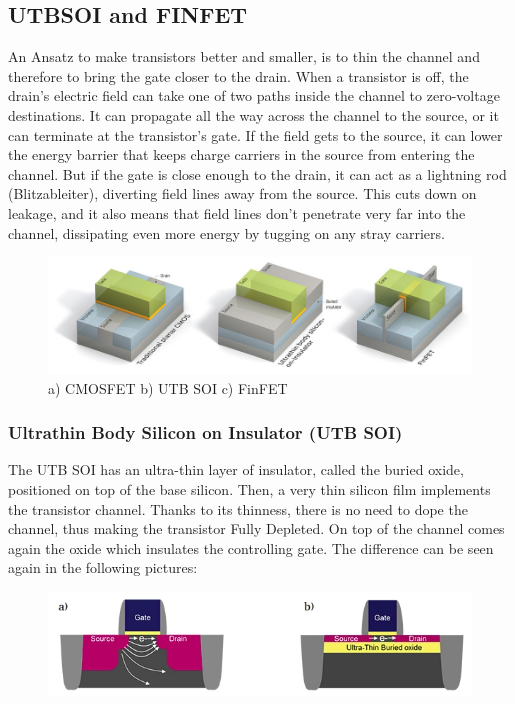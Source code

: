 \documentclass[11pt]{article}
\begin{document}
\subsection{UTBSOI and FINFET}
An Ansatz to make transistors better and smaller, is to thin the channel and therefore to bring the gate closer to the drain. When a transistor is off, the drain’s electric field can take one of two paths inside the channel to zero-voltage destinations. It can propagate all the way across the channel to the source, or it can terminate at the transistor’s gate. If the field gets to the source, it can lower the energy barrier that keeps charge carriers in the source from entering the channel. But if the gate is close enough to the drain, it can act as a lightning rod (Blitzableiter), diverting field lines away from the source. This cuts down on leakage, and it also means that field lines don’t penetrate very far into the channel, dissipating even more energy by tugging on any stray carriers.
\begin{figure}[H]
\centering
\includegraphics[width=1\textwidth]{fix_solutions}%
\caption{a) CMOSFET   b) UTB SOI   c) FinFET}
\label{fig:fix_solutions}
\end{figure}
\subsubsection{Ultrathin Body Silicon on Insulator (UTB SOI)}
The UTB SOI has an ultra-thin layer of insulator, called the buried oxide, positioned on top of the base silicon. Then, a very thin silicon film implements the transistor channel. Thanks to its thinness, there is no need to dope the channel, thus making the transistor Fully Depleted. On top of the channel comes again the oxide which insulates the controlling gate. The difference can be seen again in the following pictures:
\begin{figure}[H]
\centering
\includegraphics[width=1.1\textwidth]{UTBSOI}
\label{fig:UTBSOI}
\end{figure}
\end{document}
